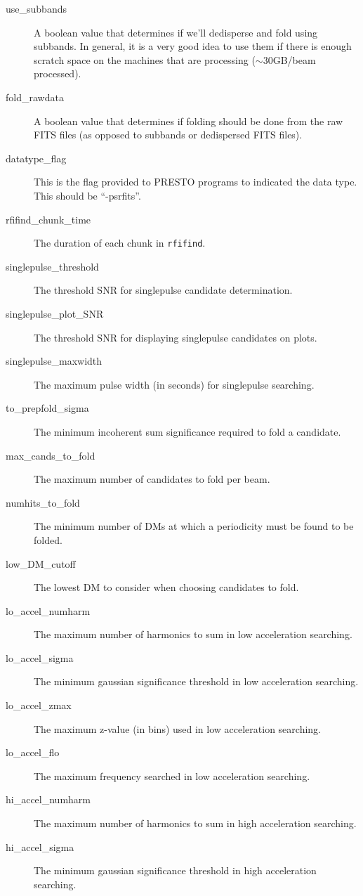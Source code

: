 \documentclass[12pt]{article}
\begin{document}
\begin{description}
    \item[use\_subbands] A boolean value that determines if we'll dedisperse and fold using subbands. In general, it is a very good idea to use them if there is enough scratch space on the machines that are processing ($\sim$30GB/beam processed).
    \item[fold\_rawdata] A boolean value that determines if folding should be done from the raw FITS files (as opposed to subbands or dedispersed FITS files).
    \item[datatype\_flag] This is the flag provided to PRESTO programs to indicated the data type. This should be ``-psrfits''.
    \item[rfifind\_chunk\_time] The duration of each chunk in \texttt{rfifind}.
    \item[singlepulse\_threshold] The threshold SNR for singlepulse candidate determination.
    \item[singlepulse\_plot\_SNR] The threshold SNR for displaying singlepulse candidates on plots.
    \item[singlepulse\_maxwidth] The maximum pulse width (in seconds) for singlepulse searching.
    \item[to\_prepfold\_sigma] The minimum incoherent sum significance required to fold a candidate.
    \item[max\_cands\_to\_fold] The maximum number of candidates to fold per beam.
    \item[numhits\_to\_fold] The minimum number of DMs at which a periodicity must be found to be folded.
    \item[low\_DM\_cutoff] The lowest DM to consider when choosing candidates to fold.
    \item[lo\_accel\_numharm] The maximum number of harmonics to sum in low acceleration searching.
    \item[lo\_accel\_sigma] The minimum gaussian significance threshold in low acceleration searching.
    \item[lo\_accel\_zmax] The maximum z-value (in bins) used in low acceleration searching.
    \item[lo\_accel\_flo] The maximum frequency searched in low acceleration searching.
    \item[hi\_accel\_numharm] The maximum number of harmonics to sum in high acceleration searching.
    \item[hi\_accel\_sigma] The minimum gaussian significance threshold in high acceleration searching.

\end{description}
\end{document}
